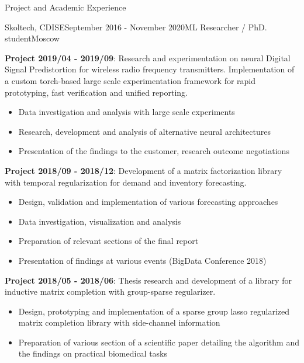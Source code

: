 \documentclass{resume} %
\begin{document}
\begin{rSection}{Project and Academic Experience}
\begin{rSubsection}{Skoltech, CDISE}{September 2016 - November 2020}{ML Researcher / PhD. student}{Moscow}
    \medskip
    \item \textbf{Project 2019/04 - 2019/09}:
    Research and experimentation on neural Digital Signal Predistortion for wireless radio
    frequency transmitters. Implementation of a custom torch-based large scale experimentation framework
    for rapid prototyping, fast verification and unified reporting. \begin{itemize}
        \item Data investigation and analysis with large scale experiments
        
        \item Research, development and analysis of alternative neural architectures
        
        \item Presentation of the findings to the customer, research outcome negotiations
    \end{itemize}

    \medskip
    \item \textbf{Project 2018/09 - 2018/12}:
    Development of a matrix factorization library with temporal regularization for demand
    and inventory forecasting. \begin{itemize}
        \item Design, validation and implementation of various forecasting approaches
        
        \item Data investigation, visualization and analysis
        
        \item Preparation of relevant sections of the final report
        
        \item Presentation of findings at various events (BigData Conference 2018)
    \end{itemize}

    \medskip
    \item \textbf{Project 2018/05 - 2018/06}:
    Thesis research and development of a library for inductive matrix completion with
    group-sparse regularizer.
    \begin{itemize}
        \item Design, prototyping and implementation of a sparse group lasso regularized
        matrix completion library with side-channel information
        
        \item Preparation of various section of a scientific paper detailing the algorithm
        and the findings on practical biomedical tasks
        

\end{itemize}
\end{rSubsection}
\end{rSection}
\end{document}
